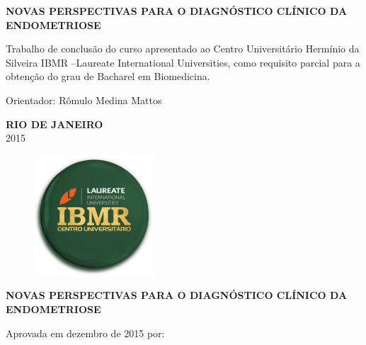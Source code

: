 \documentclass[12pt]{article} %
\begin{document}
\begin{center}
\MakeUppercase{\textbf{Novas perspectivas para o diagnóstico clínico da endometriose}}
\end{center}

\vspace{4.5cm}
Trabalho de conclusão do curso apresentado ao Centro Universitário Hermínio da Silveira IBMR  –Laureate International Universities, como requisito parcial para a obtenção do grau de Bacharel em Biomedicina.

\vspace{2.5cm}

\theauthor

\vspace{2.5cm}

Orientador: Rômulo Medina Mattos

\vspace{2.0cm}
\begin{center}
\MakeUppercase{\textbf{Rio de Janeiro}}\\
2015
\end{center}

\newpage


\begin{figure}[h!]
\centering
\includegraphics[width=4.5cm]{ibmr.png}
\end{figure}


\begin{center}
\MakeUppercase{\theauthor}
\end{center}

\vspace{2.0cm}

\begin{center}
\MakeUppercase{\textbf{Novas perspectivas para o diagnóstico clínico da endometriose}}
\end{center}

\vspace{2.0cm}

Aprovada em dezembro de 2015 por:

\vspace{9.0cm}
\end{document}
